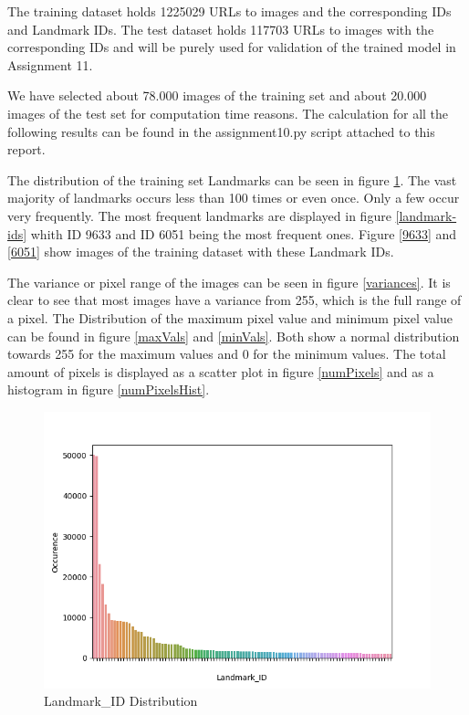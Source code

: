 The training dataset holds 1225029 URLs to images and the corresponding IDs and Landmark IDs. The test dataset holds 117703 URLs to images with the corresponding IDs and will be purely used for validation of the trained model in Assignment 11.

We have selected about 78.000 images of the training set and about 20.000 images of the test set for computation time reasons. The calculation for all the following results can be found in the assignment10.py script attached to this report.

The distribution of the training set Landmarks can be seen in figure \ref{distribution}. The vast majority of landmarks occurs less than 100 times or even once. Only a few occur very frequently. The most frequent landmarks are displayed in figure \ref{landmark-ids} whith ID 9633 and ID 6051 being the most frequent ones. Figure \ref{9633} and \ref{6051} show images of the training dataset with these Landmark IDs.

The variance or pixel range of the images can be seen in figure \ref{variances}. It is clear to see that most images have a variance from 255, which is the full range of a pixel. The Distribution of the maximum pixel value and minimum pixel value can be found in figure \ref{maxVals} and \ref{minVals}. Both show a normal distribution towards 255 for the maximum values and 0 for the minimum values. The total amount of pixels is displayed as a scatter plot in figure \ref{numPixels} and as a histogram in figure \ref{numPixelsHist}.

\begin{figure}
	\includegraphics[width=\textwidth]{images/distribution}
	\caption{Landmark\_ID Distribution}
	\label{distribution}
\end{figure}

